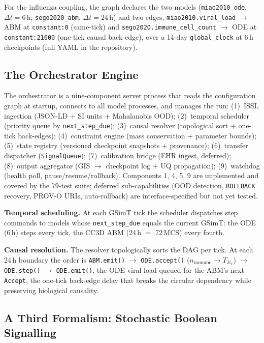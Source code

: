\documentclass[conference,letterpaper,10pt]{IEEEtran}
\begin{document}
\noindent For the influenza coupling, the graph declares the two models
(\texttt{miao2010\_ode}, $\Delta t\!=\!6$\,h; \texttt{sego2020\_abm},
$\Delta t\!=\!24$\,h) and two edges, \texttt{miao2010.viral\_load}
$\to$ ABM at \texttt{constant:0} (same-tick) and
\texttt{sego2020.immune\_cell\_count} $\to$ ODE at
\texttt{constant:21600} (one-tick causal back-edge), over a 14-day
\texttt{global\_clock} at 6\,h checkpoints (full YAML in the repository).

\subsection{The Orchestrator Engine}\label{sec:orchestrator}
The orchestrator is a nine-component server process that reads the
configuration graph at startup, connects to all model processes, and
manages the run: (1)~ISSL ingestion (JSON-LD + SI units + Mahalanobis
OOD); (2)~temporal scheduler (priority queue by \texttt{next\_step\_due});
(3)~causal resolver (topological sort + one-tick back-edges);
(4)~constraint engine (mass conservation + parameter bounds); (5)~state
registry (versioned checkpoint snapshots + provenance); (6)~transfer
dispatcher (\texttt{SignalQueue}); (7)~calibration bridge (EHR ingest,
deferred); (8)~output aggregator (GIS $\to$ checkpoint log + UQ
propagation); (9)~watchdog (health poll, pause/resume/rollback). Components
1, 4, 5, 9 are implemented and covered by the 79-test suite; deferred
sub-capabilities (OOD detection, \texttt{ROLLBACK} recovery, PROV-O URIs,
auto-rollback) are interface-specified but not yet tested.

\textbf{Temporal scheduling.} At each GSimT tick the scheduler dispatches
step commands to models whose \texttt{next\_step\_due} equals the current
GSimT: the ODE (6\,h) steps every tick, the CC3D ABM (24\,h $=$ 72\,MCS)
every fourth.

\textbf{Causal resolution.} The resolver topologically sorts the DAG per
tick. At each 24\,h boundary the order is \texttt{ABM.emit()} $\to$
\texttt{ODE.accept()} ($n_{\text{immune}}\!\to\!T_{E_T}$) $\to$
\texttt{ODE.step()} $\to$ \texttt{ODE.emit()}, the ODE viral load queued for
the ABM's next \texttt{Accept}, the one-tick back-edge delay that breaks the
circular dependency while preserving biological causality.

\subsection{A Third Formalism: Stochastic Boolean Signalling}
\label{sec:boolean}
\end{document}
